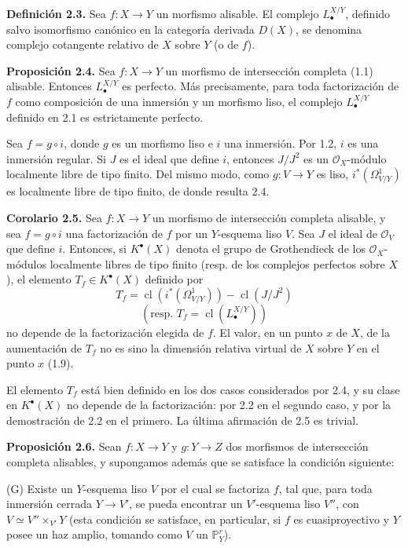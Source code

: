 \textbf{Definición 2.3.} Sea $f:X\to Y$ un morfismo alisable. El complejo
$L^{X/Y}_\bullet$, definido salvo isomorfismo canónico en la categoría derivada
$D(X)$, se denomina complejo cotangente relativo de $X$ sobre $Y$ (o de $f$).

\textbf{Proposición 2.4.} Sea $f:X\to Y$ un morfismo de intersección completa
(1.1) alisable. Entonces $L^{X/Y}_\bullet$ es perfecto. Más precisamente, para
toda factorización de $f$ como composición de una inmersión y un morfismo liso,
el complejo $L^{X/Y}_\bullet$ definido en 2.1 es estrictamente perfecto.

Sea $f=g\circ i$, donde $g$ es un morfismo liso e $i$ una inmersión. Por 1.2,
$i$ es una inmersión regular. Si $J$ es el ideal que define $i$, entonces
$J/J^2$ es un $\mathcal O_X$-módulo localmente libre de tipo finito. Del mismo
modo, como $g:V\to Y$ es liso, $i^*(\Omega^1_{V/Y})$ es localmente libre de tipo
finito, de donde resulta 2.4.

\textbf{Corolario 2.5.} Sea $f:X\to Y$ un morfismo de intersección completa
alisable, y sea $f=g\circ i$ una factorización de $f$ por un $Y$-esquema liso
$V$. Sea $J$ el ideal de $\mathcal O_V$ que define $i$. Entonces, si
$K^{\bullet}(X)$ denota el grupo de Grothendieck de los $\mathcal O_X$-módulos
localmente libres de tipo finito (resp. de los complejos perfectos sobre $X$),
el elemento $T_f\in K^{\bullet}(X)$ definido por
\[
T_f=\operatorname{cl}(i^*(\Omega^1_{V/Y}))-\operatorname{cl}(J/J^2)
\]
\[
(\text{resp. }T_f=\operatorname{cl}(L^{X/Y}_\bullet))
\]
no depende de la factorización elegida de $f$. El valor, en un punto $x$ de
$X$, de la aumentación de $T_f$ no es sino la dimensión relativa virtual de $X$
sobre $Y$ en el punto $x$ (1.9).

El elemento $T_f$ está bien definido en los dos casos considerados por 2.4, y
su clase en $K^{\bullet}(X)$ no depende de la factorización: por 2.2 en el
segundo caso, y por la demostración de 2.2 en el primero. La última afirmación
de 2.5 es trivial.

\textbf{Proposición 2.6.} Sean $f:X\to Y$ y $g:Y\to Z$ dos morfismos de
intersección completa alisables, y supongamos además que se satisface la
condición siguiente:

(G) Existe un $Y$-esquema liso $V$ por el cual se factoriza $f$, tal que, para
toda inmersión cerrada $Y\to V'$, se pueda encontrar un $V'$-esquema liso
$V''$, con $V\simeq V''\times_{V'}Y$ (esta condición se satisface, en
particular, si $f$ es cuasiproyectivo y $Y$ posee un haz amplio, tomando como
$V$ un $\mathbb P^r_Y$).

